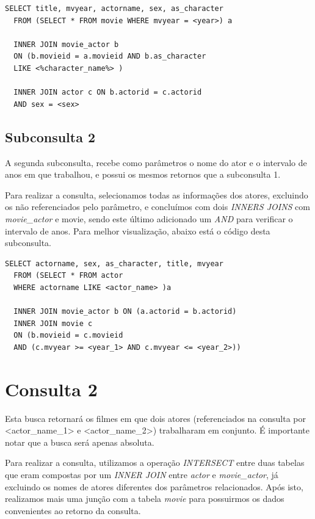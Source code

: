 \documentclass[
	12pt,				%
	oneside,			%
	a4paper,			%
	brazil				%
	]{abntex2}
\begin{document}
\begin{lstlisting}
SELECT title, mvyear, actorname, sex, as_character
  FROM (SELECT * FROM movie WHERE mvyear = <year>) a 
  
  INNER JOIN movie_actor b 
  ON (b.movieid = a.movieid AND b.as_character 
  LIKE <%character_name%> )
  
  INNER JOIN actor c ON b.actorid = c.actorid 
  AND sex = <sex>

\end{lstlisting}


\subsection{Subconsulta 2}
A segunda subconsulta, recebe como parâmetros o nome do ator e o intervalo de anos em que trabalhou, e possui os mesmos retornos que a subconsulta 1.

Para realizar a consulta, selecionamos todas as informações dos atores, excluindo os não referenciados pelo parâmetro, e concluímos com dois \textit{INNERS JOINS} com \textit{movie\_actor} e movie, sendo este último adicionado um \textit{AND} para verificar o intervalo de anos. Para melhor visualização, abaixo está o código desta subconsulta.


\begin{lstlisting}
SELECT actorname, sex, as_character, title, mvyear
  FROM (SELECT * FROM actor 
  WHERE actorname LIKE <actor_name> )a
  
  INNER JOIN movie_actor b ON (a.actorid = b.actorid)
  INNER JOIN movie c 
  ON (b.movieid = c.movieid 
  AND (c.mvyear >= <year_1> AND c.mvyear <= <year_2>))

\end{lstlisting}


\section{Consulta 2}

Esta busca retornará os filmes em que dois atores (referenciados na consulta por <actor\_name\_1> e <actor\_name\_2>) trabalharam em conjunto. É importante notar que a busca será apenas absoluta.

Para realizar a consulta, utilizamos a operação \textit{INTERSECT} entre duas tabelas que eram compostas por um \textit{INNER JOIN} entre \textit{actor} e \textit{movie\_actor}, já excluindo os nomes de atores diferentes dos parâmetros relacionados. Após isto, realizamos mais uma junção com a tabela \textit{movie} para possuirmos os dados convenientes ao retorno da consulta. 
\end{document}
